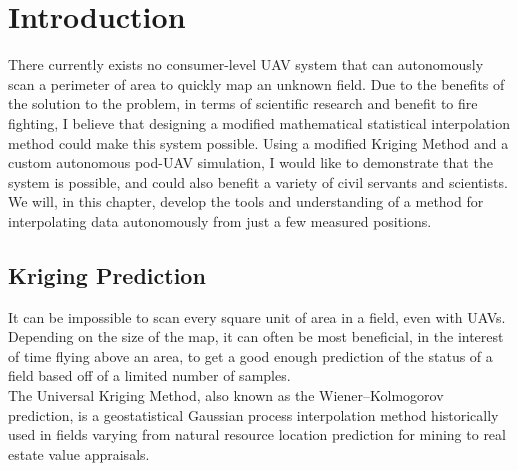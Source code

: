\documentclass[11pt]{ucthesis}
\begin{document}
\chapter{Introduction}
There currently exists no consumer-level UAV system that can autonomously scan a perimeter of area to quickly map an unknown field. Due to the benefits of the solution to the problem, in terms of scientific research and benefit to fire fighting, I believe that designing a modified mathematical statistical interpolation method could make this system possible. Using a modified Kriging Method and a custom autonomous pod-UAV simulation, I would like to demonstrate that the system is possible, and could also benefit a variety of civil servants and scientists. We will, in this chapter, develop the tools and understanding of a method for interpolating data autonomously from just a few measured positions.

\section{Kriging Prediction}
It can be impossible to scan every square unit of area in a field, even with UAVs. Depending on the size of the map, it can often be most beneficial, in the interest of time flying above an area, to get a good enough prediction of the status of a field based off of a limited number of samples.\\
The Universal Kriging Method, also known as the Wiener–Kolmogorov prediction, is a geostatistical Gaussian process interpolation method historically used in fields varying from natural resource location prediction for mining to real estate value appraisals.\\
\end{document}
